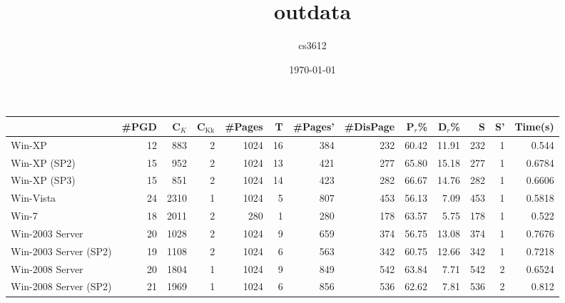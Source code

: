\documentclass[11pt]{article}
\title{outdata}
\author{cs3612}
\date{\today}
\begin{document}
\maketitle

\setcounter{tocdepth}{3}
\tableofcontents
\vspace*{1cm}

\begin{center}
\begin{tabular}{lrrrrrrrrrrrr}
                        &  \#PGD  &   C$_K$  &  C$_{\mathrm{Kk}}$  &  \#Pages  &     T  &  \#Pages'  &  \#DisPage  &  P$_r$\%  &  D$_r$\%  &       S  &   S'  &  Time(s)  \\
\hline
 Win-XP                 &     12  &     883  &                  2  &     1024  &    16  &       384  &        232  &    60.42  &    11.91  &     232  &    1  &    0.544  \\
 Win-XP (SP2)           &     15  &     952  &                  2  &     1024  &    13  &       421  &        277  &    65.80  &    15.18  &     277  &    1  &   0.6784  \\
 Win-XP (SP3)           &     15  &     851  &                  2  &     1024  &    14  &       423  &        282  &    66.67  &    14.76  &     282  &    1  &   0.6606  \\
 Win-Vista              &     24  &    2310  &                  1  &     1024  &     5  &       807  &        453  &    56.13  &     7.09  &     453  &    1  &   0.5818  \\
 Win-7                  &     18  &    2011  &                  2  &      280  &     1  &       280  &        178  &    63.57  &     5.75  &     178  &    1  &    0.522  \\
 Win-2003 Server        &     20  &    1028  &                  2  &     1024  &     9  &       659  &        374  &    56.75  &    13.08  &     374  &    1  &   0.7676  \\
 Win-2003 Server (SP2)  &     19  &    1108  &                  2  &     1024  &     6  &       563  &        342  &    60.75  &    12.66  &     342  &    1  &   0.7218  \\
 Win-2008 Server        &     20  &    1804  &                  1  &     1024  &     9  &       849  &        542  &    63.84  &     7.71  &     542  &    2  &   0.6524  \\
 Win-2008 Server (SP2)  &     21  &    1969  &                  1  &     1024  &     6  &       856  &        536  &    62.62  &     7.81  &     536  &    2  &    0.812  \\

\end{tabular}
\end{center}
\end{document}
